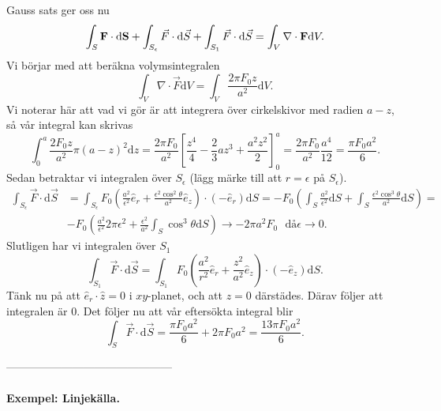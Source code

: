 \documentclass[%
oneside,                 %
final,                   %
10pt]{article}
\begin{document}
Gauss sats ger oss nu
\begin{equation}
  \int_S {\bf F\cdot \mbox{d}S} + \int_{S_\epsilon} \vec{F} \cdot \mbox{d}\vec{S}
+ \int_{S_1} \vec{F} \cdot \mbox{d}\vec{S} = \int_V {\bf \nabla \cdot F} \mbox{d}V.
\end{equation}
Vi börjar med att beräkna volymsintegralen
\begin{equation}
  \int_V \nabla \cdot \vec{F} \mbox{d}V = \int_V \frac{2\pi F_0 z}{a^2}
\mbox{d}V.
\end{equation}
Vi noterar här att vad vi gör är att integrera över cirkelskivor med radien $a -z$, så vår integral kan skrivas
\begin{equation}
  \int_0^a \frac{2 F_0 z}{a^2} \pi \left(a-z\right)^2 \mbox{d}z = 
\frac{2\pi F_0}{a^2}\left[\frac{z^4}{4} -\frac{2}{3} a z^3 + \frac{a^2 z^2}{2}
\right]_0^a = \frac{2\pi F_0}{a^2} \frac{a^4}{12} = \frac{\pi F_0 a^2}{6}.
\end{equation}
Sedan betraktar vi integralen över $S_\epsilon$ (lägg märke till att 
$r = \epsilon$ på $S_\epsilon$).
\begin{align}
  \int_{S_\epsilon} \vec{F} \cdot \mbox{d}\vec{S} &= \int_{S_\epsilon} 
F_0 \left(\frac{a^2}{\epsilon^2} \hat{e}_{r} + 
\frac{\epsilon^2 \cos^2 \theta}{a^2} \hat{e}_{z}\right) \cdot \left(-
\hat{e}_{r}\right) \mbox{d}S = - F_0 \left(\int_S \frac{a^2}{\epsilon^2}
\mbox{d}S + \int_S \frac{\epsilon^2 \cos^3 \theta}{a^2}\mbox{d}S\right) =
\nonumber \\
&- F_0 \left( \frac{a^2}{\epsilon^2} 2\pi \epsilon^2 + \frac{\epsilon^2}{a^2}
\int_S \cos^3 \theta \mbox{d}S\right) \to - 2\pi a^2 F_0 \,\,\,\,\mathrm{då }
\epsilon \to 0.
\end{align}
Slutligen har vi integralen över $S_1$
\begin{equation}
  \int_{S_1} \vec{F} \cdot \mbox{d}\vec{S} = \int_{S_1} F_0 \left(\frac{a^2}{r^2}
\hat{e}_{r} + \frac{z^2}{a^2} \hat{e}_{z}\right)\cdot\left(-\hat{e}_{z}
\right)\mbox{d}S.
\end{equation}
Tänk nu på att $\hat{e}_{r} \cdot \hat{z} = 0$ i $xy$-planet, och att $z = 0$ därstädes.  Därav följer att integralen är 0. Det följer nu att vår eftersökta integral blir
\begin{equation}
  \int_S \vec{F} \cdot \mbox{d}\vec{S} = \frac{\pi F_0 a^2}{6} + 2\pi F_0 a^2
= \frac{13\pi F_0 a^2}{6}.
\end{equation}

---------------------------------------------

\paragraph{Exempel: Linjekälla.}
\end{document}
